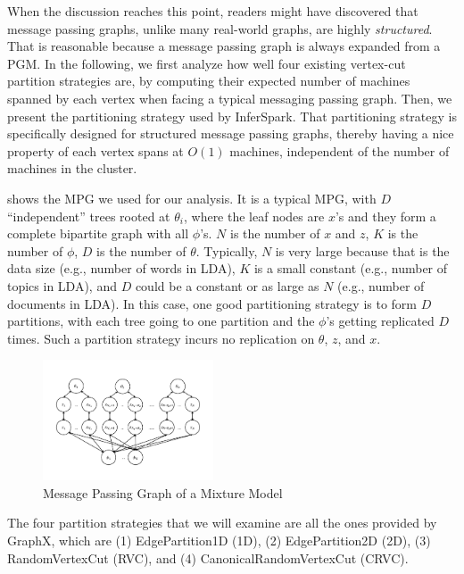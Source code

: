 When the discussion reaches this point,
readers might have discovered that
message passing graphs, unlike many real-world graphs,
are highly \emph{structured}.
That is reasonable because a message passing graph
is always expanded from a PGM.
In the following, we first analyze how well
four existing vertex-cut partition strategies are,
by computing their
expected number of machines spanned by each vertex
when facing a typical messaging passing graph.
Then, we present the partitioning strategy used by InferSpark.
That partitioning strategy is specifically designed for
{structured} message passing graphs,
thereby having a nice property of each vertex spans at $O(1)$ machines,
independent of the number of machines in the cluster.

 shows the MPG we used for our analysis.
It is a typical MPG, with $D$ ``independent'' trees rooted at $\theta_i$,
where the leaf nodes  are $x$'s and they form a complete bipartite graph with all $\phi$'s.
$N$
is the number of $x$ and $z$, $K$ is the number of $\phi$, $D$ is the number
of $\theta$. Typically, $N$ is very large because that is the data size (e.g.,
number of words in LDA), $K$ is a small constant (e.g., number of topics in
LDA), and $D$ could be a constant or as large as $N$ (e.g., number of
documents in LDA).
In this case, one good partitioning strategy is to form $D$ partitions,
with each tree going to one partition and the $\phi$'s getting replicated $D$ times.
Such a partition strategy incurs no replication on $\theta$, $z$, and $x$.








\begin{figure}[h]
	\includegraphics[width=0.45\textwidth]{figs/Graph1}
	\caption{Message Passing Graph of a Mixture Model}
	\label{fig:mixture_mpg}
\end{figure}

The four partition
strategies that we will examine
are all the ones provided by GraphX,
which are
(1) EdgePartition1D (1D),
(2) EdgePartition2D  (2D),
(3) RandomVertexCut (RVC), and
(4) CanonicalRandomVertexCut (CRVC).


